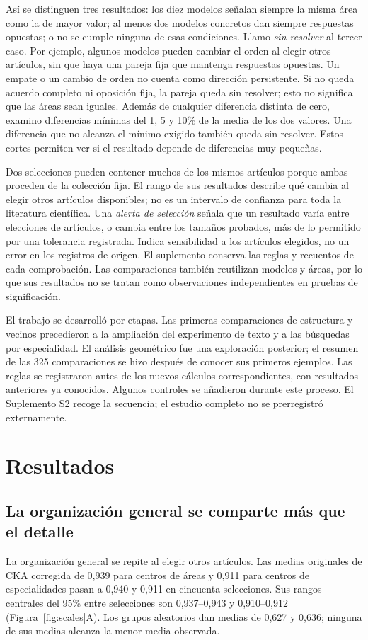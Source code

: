 \documentclass[12pt]{article}
\begin{document}
Así se distinguen tres resultados: los diez modelos señalan siempre la misma área como la de mayor valor; al menos dos modelos concretos dan siempre respuestas opuestas; o no se cumple ninguna de esas condiciones. Llamo \emph{sin resolver} al tercer caso. Por ejemplo, algunos modelos pueden cambiar el orden al elegir otros artículos, sin que haya una pareja fija que mantenga respuestas opuestas. Un empate o un cambio de orden no cuenta como dirección persistente. Si no queda acuerdo completo ni oposición fija, la pareja queda sin resolver; esto no significa que las áreas sean iguales. Además de cualquier diferencia distinta de cero, examino diferencias mínimas del 1, 5 y 10\% de la media de los dos valores. Una diferencia que no alcanza el mínimo exigido también queda sin resolver. Estos cortes permiten ver si el resultado depende de diferencias muy pequeñas.

Dos selecciones pueden contener muchos de los mismos artículos porque ambas proceden de la colección fija. El rango de sus resultados describe qué cambia al elegir otros artículos disponibles; no es un intervalo de confianza para toda la literatura científica. Una \emph{alerta de selección} señala que un resultado varía entre elecciones de artículos, o cambia entre los tamaños probados, más de lo permitido por una tolerancia registrada. Indica sensibilidad a los artículos elegidos, no un error en los registros de origen. El suplemento conserva las reglas y recuentos de cada comprobación. Las comparaciones también reutilizan modelos y áreas, por lo que sus resultados no se tratan como observaciones independientes en pruebas de significación.

El trabajo se desarrolló por etapas. Las primeras comparaciones de estructura y vecinos precedieron a la ampliación del experimento de texto y a las búsquedas por especialidad. El análisis geométrico fue una exploración posterior; el resumen de las 325 comparaciones se hizo después de conocer sus primeros ejemplos. Las reglas se registraron antes de los nuevos cálculos correspondientes, con resultados anteriores ya conocidos. Algunos controles se añadieron durante este proceso. El Suplemento S2 recoge la secuencia; el estudio completo no se prerregistró externamente.

\section{Resultados}
\FloatBarrier
\subsection{La organización general se comparte más que el detalle}
La organización general se repite al elegir otros artículos. Las medias originales de CKA corregida de 0,939 para centros de áreas y 0,911 para centros de especialidades pasan a 0,940 y 0,911 en cincuenta selecciones. Sus rangos centrales del 95\% entre selecciones son 0,937--0,943 y 0,910--0,912 (Figura~\ref{fig:scales}A). Los grupos aleatorios dan medias de 0,627 y 0,636; ninguna de sus medias alcanza la menor media observada.
\end{document}
